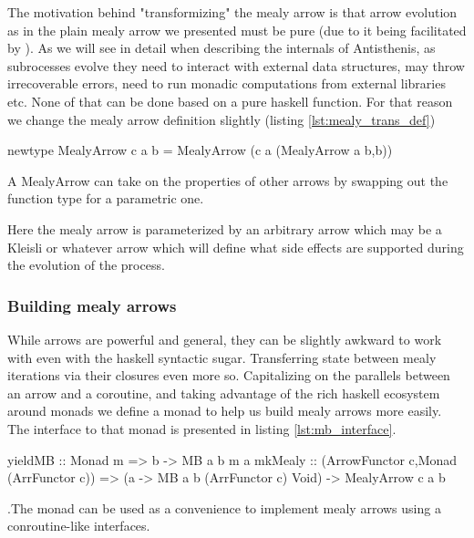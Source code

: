 The motivation behind "transformizing" the mealy arrow is that arrow
evolution as in the plain mealy arrow we presented must be pure (due
to it being facilitated by \hask{->}). As we will see in detail when
describing the internals of Antisthenis, as subrocesses evolve they
need to interact with external data structures, may throw
irrecoverable errors, need to run monadic computations from external
libraries etc. None of that can be done based on a pure haskell
function. For that reason we change the mealy arrow definition
slightly (listing \ref{lst:mealy_trans_def})

\begin{code}
\begin{haskellcode}
newtype MealyArrow c a b =
  MealyArrow (c a (MealyArrow a b,b))
\end{haskellcode}
  \caption{\label{lst:mealy_trans_def}A MealyArrow can take on the
    properties of other arrows by swapping out the function \hask{->}
    type for a parametric one.}
\end{code}

Here the mealy arrow is parameterized by an arbitrary arrow  which
may be a Kleisli or whatever arrow which will define what side effects
are supported during the evolution of the process.

\subsubsection{Building mealy arrows}

While arrows are powerful and general, they can be slightly awkward to
work with even with the haskell  syntactic
sugar. Transferring state between mealy iterations via their closures
even more so. Capitalizing on the parallels between an arrow and a
coroutine, and taking advantage of the rich haskell ecosystem around
monads we define a monad  to help us build mealy arrows
more easily. The interface to that monad is presented in listing
\ref{lst:mb_interface}.

\begin{code}
\begin{haskellcode}
yieldMB :: Monad m => b -> MB a b m a
mkMealy :: (ArrowFunctor c,Monad (ArrFunctor c))
        => (a -> MB a b (ArrFunctor c) Void)
        -> MealyArrow c a b
\end{haskellcode}
  \caption{\label{lst:mb_interface}.The  monad can be
    used as a convenience to implement mealy arrows using a
    conroutine-like interfaces.}
\end{code}

